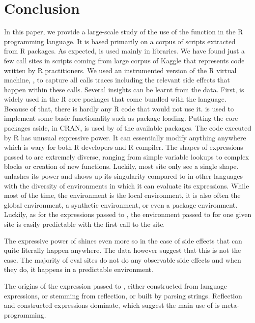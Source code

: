 \documentclass[review,screen,acmsmall,anonymous=true]{acmart}
\begin{document}
\section{Conclusion}

In this paper, we provide a large-scale study of the use of the \eval function
in the R programming language. It is based primarily on a corpus of
\CranRunnableScripts scripts extracted from \CranPackages R packages. As
expected, \eval is used mainly in libraries. We have found just a few \eval
call sites in scripts coming from large corpus of Kaggle that represents code
written by R practitioners. We used an instrumented version of the R virtual
machine, \rdyntrace, to capture all \eval calls traces including the relevant
side effects that happen within these calls. Several insights can be learnt
from the data.
%
First, \eval is widely used in the R core packages that come bundled with the
language. Because of that, there is hardly any R code that would not use it.
\eval is used to implement some basic functionality such as package loading.
Putting the core packages aside, in CRAN, \eval is used by \PkgPackagesRatio of
the available \CranPackages packages.
%
The code executed by R \eval has unusual expressive power. It can essentially
modify anything anywhere which is wary for both R developers and R compiler. The shapes of expressions passed to \eval are extremely diverse, ranging from simple variable lookups to complex blocks or creation of new functions. Luckily, most site only see a single shape. \eval unlashes its power and shows up its singularity compared to \eval in other languages with the diversity of environments in which it can evaluate its expressions. While most of the time, the \eval environment is the local environment, it is also often the global environment, a synthetic environment, or even a package environment. Luckily, as for the expressions passed to \eval, the environment passed to \eval for one given site is easily predictable with the first call to the site.

The expressive power of \eval shines even more  so in the case of side effects that can quite literally happen anywhere. The data however suggest that this is not the case. The majority of eval sites do not do any observable side effects and when they do, it happens in a predictable environment.

The origins of the expression passed to \eval, either constructed from language expressions, or stemming from reflection, or built by parsing strings. Reflection and constructed expressions dominate, which suggest the main use of \eval is meta-programming. %
\end{document}
